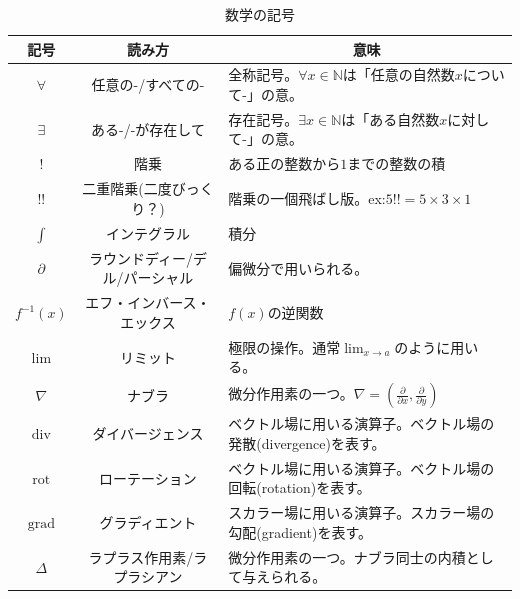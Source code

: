 \documentclass[a4j,dvipdfmx]{jsarticle}
\begin{document}
\begin{table}[h]
                    \caption*{数学の記号}
                    \centering
                    \begin{tabular}{|c|c|l|}\hline
                        記号 & 読み方 & \multicolumn{1}{c|}{意味}\\\hline
                        $\forall$ & 任意の-/すべての- & 全称記号。$\forall x \in \mathbb{N}$は「任意の自然数$x$について-」の意。\\\hline
                        $\exists$ & ある-/-が存在して & 存在記号。$\exists x \in \mathbb{N}$は「ある自然数$x$に対して-」の意。 \\\hline
                        $!$ & 階乗 & ある正の整数から$1$までの整数の積\\\hline
                        $!!$ & 二重階乗(二度びっくり？) & 階乗の一個飛ばし版。ex:\hspace{1mm}$5!!=5\times3\times1$\\\hline
                        $\int$ & インテグラル & 積分 \\\hline
                        $\partial$ & ラウンドディー/デル/パーシャル & 偏微分で用いられる。\\\hline
                        $f^{-1}(x)$ & エフ・インバース・エックス & $f(x)$の逆関数\\\hline
                        $\lim$ & リミット & 極限の操作。通常$\displaystyle\lim_{x\to a}$のように用いる。\\\hline
                        $\nabla$ & ナブラ & 微分作用素の一つ。$\nabla=\left(\frac{\partial}{\partial x},\frac{\partial}{\partial y}\right)$\\\hline
                        $\mathrm{div}$ & ダイバージェンス & ベクトル場に用いる演算子。ベクトル場の発散(divergence)を表す。\\\hline
                        $\mathrm{rot}$ & ローテーション & ベクトル場に用いる演算子。ベクトル場の回転(rotation)を表す。\\\hline
                        $\mathrm{grad}$ & グラディエント & スカラー場に用いる演算子。スカラー場の勾配(gradient)を表す。\\\hline
                        $\varDelta$ & ラプラス作用素/ラプラシアン & 微分作用素の一つ。ナブラ同士の内積として与えられる。\\\hline
                    \end{tabular}
                \end{table}
        \clearpage

        \thispagestyle{fancy}
        \fancyhead{}
\end{document}
